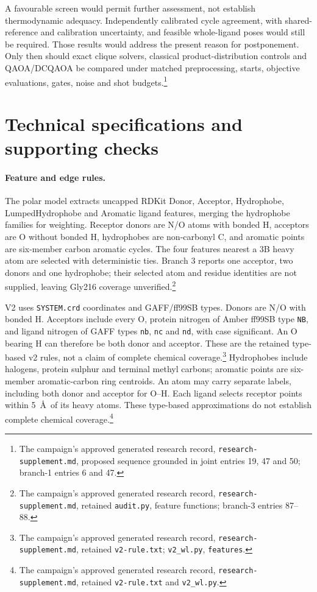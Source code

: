 \documentclass{article}
\newcommand{\rr}[1]{\footnote{The campaign's approved generated research record, \texttt{research-supplement.md}, #1.}}
\begin{document}
A favourable screen would permit further assessment, not establish thermodynamic adequacy. Independently calibrated cycle agreement, with shared-reference and calibration uncertainty, and feasible whole-ligand poses would still be required. Those results would address the present reason for postponement. Only then should exact clique solvers, classical product-distribution controls and QAOA/DCQAOA be compared under matched preprocessing, starts, objective evaluations, gates, noise and shot budgets.\rr{proposed sequence grounded in joint entries 19, 47 and 50; branch-1 entries 6 and 47}

\appendix
\section{Technical specifications and supporting checks}

\paragraph{Feature and edge rules.}
The polar model extracts uncapped RDKit Donor, Acceptor, Hydrophobe, LumpedHydrophobe and Aromatic ligand features, merging the hydrophobe families for weighting. Receptor donors are N/O atoms with bonded H, acceptors are O without bonded H, hydrophobes are non-carbonyl C, and aromatic points are six-member carbon aromatic cycles. The four features nearest a 3B heavy atom are selected with deterministic ties. Branch 3 reports one acceptor, two donors and one hydrophobe; their selected atom and residue identities are not supplied, leaving Gly216 coverage unverified.\rr{retained \texttt{audit.py}, feature functions; branch-3 entries 87--88}

V2 uses \texttt{SYSTEM.crd} coordinates and GAFF/ff99SB types. Donors are N/O with bonded H. Acceptors include every O, protein nitrogen of Amber ff99SB type \texttt{NB}, and ligand nitrogen of GAFF types \texttt{nb}, \texttt{nc} and \texttt{nd}, with case significant. An O bearing H can therefore be both donor and acceptor. These are the retained type-based v2 rules, not a claim of complete chemical coverage.\rr{retained \texttt{v2-rule.txt}; \texttt{v2\_wl.py}, \texttt{features}} Hydrophobes include halogens, protein sulphur and terminal methyl carbons; aromatic points are six-member aromatic-carbon ring centroids. An atom may carry separate labels, including both donor and acceptor for O--H. Each ligand selects receptor points within 5~\AA\ of its heavy atoms. These type-based approximations do not establish complete chemical coverage.\rr{retained \texttt{v2-rule.txt} and \texttt{v2\_wl.py}}
\end{document}
